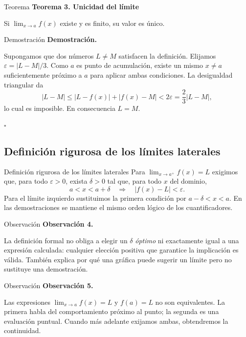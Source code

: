 \documentclass[12pt,aspectratio=169]{beamer}
\begin{document}
\begin{frame}[t,allowframebreaks]{Teorema}
{\color{azul}\bfseries Teorema 3. Unicidad del límite}\par\medskip

Si $\lim_{x\to a}f(x)$ existe y es finito, su valor es único.
\end{frame}


\begin{frame}[t,allowframebreaks]{Demostración}
{\color{azul}\bfseries Demostración.}\par\smallskip

Supongamos que dos números $L\ne M$ satisfacen la definición. Elijamos $\varepsilon=|L-M|/3$. Como $a$ es punto de acumulación, existe un mismo $x\ne a$ suficientemente próximo a $a$ para aplicar ambas condiciones. La desigualdad triangular da
\[
 |L-M|\le|L-f(x)|+|f(x)-M|<2\varepsilon=\frac23|L-M|,
\]
lo cual es imposible. En consecuencia $L=M$.

\hfill $\square$
\end{frame}


\subsection{Definición rigurosa de los límites laterales}

\begin{frame}[t,allowframebreaks]{Definición rigurosa de los límites laterales}
Para $\lim_{x\to a^+}f(x)=L$ exigimos que, para todo $\varepsilon>0$, exista $\delta>0$ tal que, para todo $x$ del dominio,
\[
 a<x<a+\delta\quad\Longrightarrow\quad|f(x)-L|<\varepsilon.
\]
Para el límite izquierdo sustituimos la primera condición por $a-\delta<x<a$. En las demostraciones se mantiene el mismo orden lógico de los cuantificadores.
\end{frame}


\begin{frame}[t,allowframebreaks]{Observación}
{\color{azul}\bfseries Observación 4.}\par\medskip

La definición formal no obliga a elegir un $\delta$ \emph{óptimo} ni exactamente igual a una expresión calculada: cualquier elección positiva que garantice la implicación es válida. También explica por qué una gráfica puede sugerir un límite pero no sustituye una demostración.
\end{frame}


\begin{frame}[t,allowframebreaks]{Observación}
{\color{azul}\bfseries Observación 5.}\par\medskip

Las expresiones $\lim_{x\to a}f(x)=L$ y $f(a)=L$ no son equivalentes. La primera habla del comportamiento próximo al punto; la segunda es una evaluación puntual. Cuando más adelante exijamos ambas, obtendremos la continuidad.
\end{frame}
\end{document}
